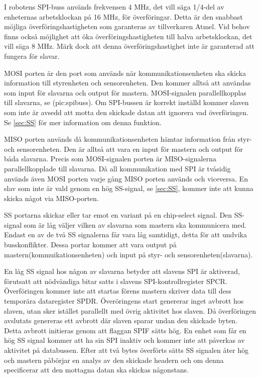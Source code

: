 I robotens SPI-buss används frekvensen 4 MHz, det vill säga 1/4-del av enheternas arbetsklockan på 16 MHz, för överföringar. Detta är den snabbast möjliga överföringshastigheten som garanteras av tillverkaren Atmel. Vid behov finns också möjlighet att öka överföringshastigheten till halva arbetsklockan, det vill säga 8 MHz. Märk dock att denna överföringshastighet inte är garanterad att fungera för slavar.


MOSI porten är den port som används när kommunikationsenheten ska skicka information till styrenheten och sensorenheten. Den kommer alltså att användas som input för slavarna och output för mastern. MOSI-signalen parallellkopplas till slavarna, se \fig(pic:spibuss). Om SPI-bussen är korrekt inställd kommer slaven som inte är avsedd att motta den skickade datan att ignorera vad överföringen. Se \ref{sec:SS} för mer information om denna funktion.

MISO porten används då kommunikationsenheten hämtar information från styr- och sensorenheten. Den är alltså att vara en input för mastern och output för båda slavarna. Precis som MOSI-signalen porten är MISO-signalerna parallellkopplade till slavarna.  Då all kommunikation med SPI är tvåsidig används även MOSI porten varje gång MISO porten används och viceversa. En slav som inte är vald genom en hög SS-signal, se \ref{sec:SS}, kommer inte att kunna skicka något via MISO-porten. 

\label{sec:SS}
SS portarna skickar eller tar emot en variant på en chip-select signal. Den SS-signal som är låg väljer vilken av slavarna som mastern ska kommunicera med. Endast en av de två SS signalerna får vara låg samtidigt, detta för att undvika busskonflikter. Dessa portar kommer att vara output på mastern(kommuikationsenheten) och input på styr- och sensorenheten(slavarna).

En låg SS signal hos någon av slavarna betyder att slavens SPI är aktiverad, förutsatt att nödvändiga bitar satts i slavens SPI-kontrollregister SPCR. Överföringen kommer inte att startas förens mastern skriver data till dess temporära dataregister SPDR. Överöringens start genererar inget avbrott hos slaven, utan sker istället parallellt med övrig aktivitet hos slaven. Då överföringen avslutats genereras ett avbrott där slaven sparar undan den skickade byten. Detta avbrott initieras genom att flaggan SPIF sätts hög. En enhet som får en hög SS signal kommer att ha sin SPI inaktiv och kommer inte att påverkas av aktivitet på databussen. Efter att två bytes överförts sätts SS signalen åter hög och mastern påbörjar en analys av den skickade headern och om denna specificerar att den mottagna datan ska skickas någonstans.

